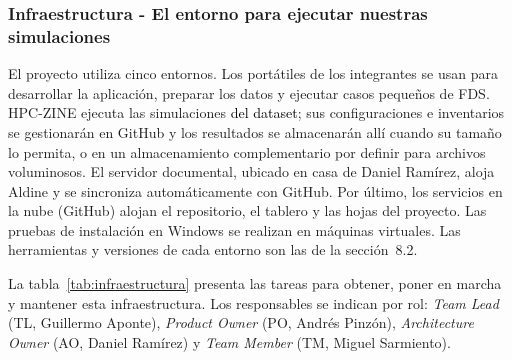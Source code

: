 
\subsubsection{Infraestructura - El entorno para ejecutar nuestras simulaciones}\label{sec:spmp-9-2-2}
El proyecto utiliza cinco entornos. Los portátiles de los integrantes se usan para desarrollar la aplicación, preparar los datos y ejecutar casos pequeños de FDS. HPC-ZINE ejecuta las simulaciones \textcolor{black}{del dataset}; sus configuraciones e inventarios se gestionarán en GitHub y los resultados se almacenarán allí cuando su tamaño lo permita, o en un almacenamiento complementario por definir para archivos voluminosos. El servidor documental, ubicado en casa de Daniel Ramírez, aloja Aldine y se sincroniza automáticamente con GitHub. Por último, los servicios en la nube (GitHub) alojan el repositorio, el tablero y las hojas del proyecto. Las pruebas de instalación en Windows se realizan en máquinas virtuales. Las herramientas y versiones de cada entorno son las de la sección~8.2.
 
La tabla~\ref{tab:infraestructura} presenta las tareas para obtener, poner en marcha y mantener esta infraestructura. Los responsables se indican por rol: \textit{Team Lead} (TL, Guillermo Aponte), \textit{Product Owner} (PO, Andrés Pinzón), \textit{Architecture Owner} (AO, Daniel Ramírez) y \textit{Team Member} (TM, Miguel Sarmiento).
 
